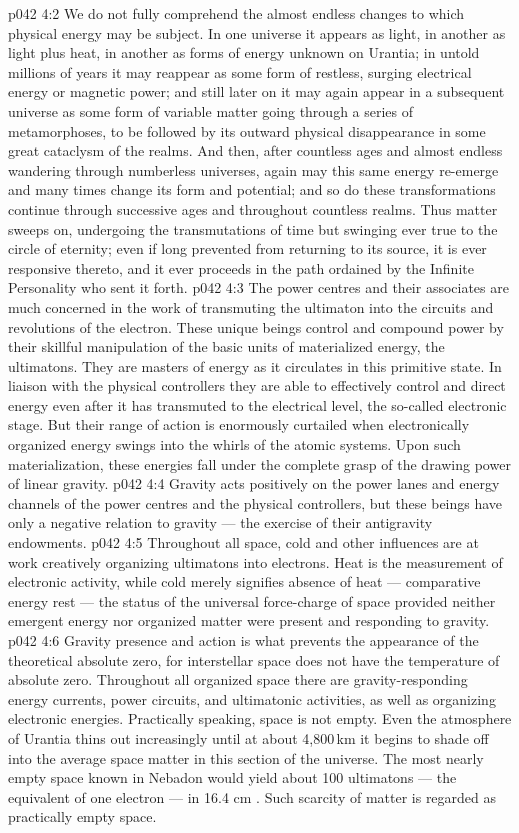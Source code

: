 \vs p042 4:2 We do not fully comprehend the almost endless changes to which physical energy may be subject. In one universe it appears as light, in another as light plus heat, in another as forms of energy unknown on Urantia; in untold millions of years it may reappear as some form of restless, surging electrical energy or magnetic power; and still later on it may again appear in a subsequent universe as some form of variable matter going through a series of metamorphoses, to be followed by its outward physical disappearance in some great cataclysm of the realms. And then, after countless ages and almost endless wandering through numberless universes, again may this same energy re\hyp{}emerge and many times change its form and potential; and so do these transformations continue through successive ages and throughout countless realms. Thus matter sweeps on, undergoing the transmutations of time but swinging ever true to the circle of eternity; even if long prevented from returning to its source, it is ever responsive thereto, and it ever proceeds in the path ordained by the Infinite Personality who sent it forth.
\vs p042 4:3 The power centres and their associates are much concerned in the work of transmuting the ultimaton into the circuits and revolutions of the electron. These unique beings control and compound power by their skillful manipulation of the basic units of materialized energy, the ultimatons. They are masters of energy as it circulates in this primitive state. In liaison with the physical controllers they are able to effectively control and direct energy even after it has transmuted to the electrical level, the so\hyp{}called electronic stage. But their range of action is enormously curtailed when electronically organized energy swings into the whirls of the atomic systems. Upon such materialization, these energies fall under the complete grasp of the drawing power of linear gravity.
\vs p042 4:4 Gravity acts positively on the power lanes and energy channels of the power centres and the physical controllers, but these beings have only a negative relation to gravity --- the exercise of their antigravity endowments.
\vs p042 4:5 Throughout all space, cold and other influences are at work creatively organizing ultimatons into electrons. Heat is the measurement of electronic activity, while cold merely signifies absence of heat --- comparative energy rest --- the status of the universal force\hyp{}charge of space provided neither emergent energy nor organized matter were present and responding to gravity.
\vs p042 4:6 Gravity presence and action is what prevents the appearance of the theoretical absolute zero, for interstellar space does not have the temperature of absolute zero. Throughout all organized space there are gravity\hyp{}responding energy currents, power circuits, and ultimatonic activities, as well as organizing electronic energies. Practically speaking, space is not empty. Even the atmosphere of Urantia thins out increasingly until at about 4,800\,km it begins to shade off into the average space matter in this section of the universe. The most nearly empty space known in Nebadon would yield about 100 ultimatons --- the equivalent of one electron --- in 16.4 cm . Such scarcity of matter is regarded as practically empty space.
